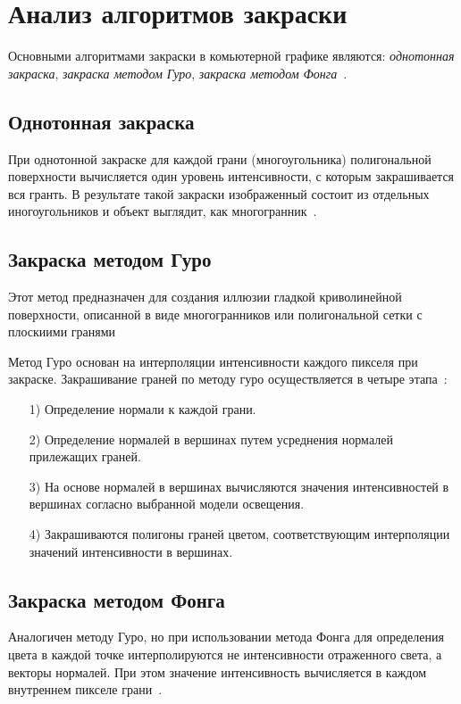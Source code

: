 \section{Анализ алгоритмов закраски}

Основными алгоритмами закраски в комьютерной графике являются: \textit{однотонная закраска}, \textit{закраска методом Гуро}, \textit{закраска методом Фонга}~\cite{rogers}.

\subsection{Однотонная закраска}
При однотонной закраске для каждой грани (многоугольника) полигональной поверхности вычисляется один уровень интенсивности, с которым закрашивается вся гранть. В результате такой закраски изображенный состоит из отдельных иногоугольников и объект выглядит, как многогранник~\cite{rogers}.

\subsection{Закраска методом Гуро}
Этот метод предназначен для создания иллюзии гладкой криволинейной поверхности, описанной в виде многогранников или полигональной сетки с плоскиими гранями\cite{rogers,porev,foley}

Метод Гуро основан на интерполяции интенсивности каждого пикселя при закраске. Закрашивание граней по методу гуро осуществляется в четыре этапа~\cite{porev}:

\begin{enumerate}
    \item [1)] Определение нормали к каждой грани.
    \item [2)] Определение нормалей в вершинах путем усреднения нормалей прилежащих граней.
    \item [3)] На основе нормалей в вершинах вычисляются значения интенсивностей в вершинах согласно выбранной модели освещения.
    \item [4)] Закрашиваются полигоны граней цветом, соответствующим интерполяции значений интенсивности в вершинах.
\end{enumerate}

\subsection{Закраска методом Фонга}

Аналогичен методу Гуро, но при использовании метода Фонга для определения цвета в каждой точке интерполируются не интенсивности отраженного света, а векторы нормалей. При этом значение интенсивность вычисляется в каждом внутреннем пикселе грани~\cite{rogers,porev}.

